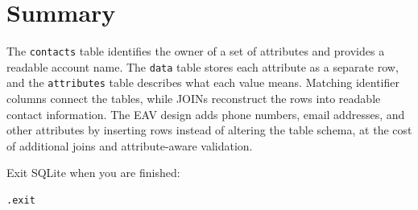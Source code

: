 \documentclass[11pt]{article}
\begin{document}
\section*{Summary}

The \texttt{contacts} table identifies the owner of a set of attributes and
provides a readable account name.
The \texttt{data} table stores each attribute as a separate row, and the
\texttt{attributes} table describes what each value means. Matching
identifier columns connect the tables, while JOINs reconstruct the rows into
readable contact information. The EAV design adds phone numbers, email
addresses, and other attributes by inserting rows instead of altering the table
schema, at the cost of additional joins and attribute-aware validation.

Exit SQLite when you are finished:

\begin{lstlisting}[language=SQL]
.exit
\end{lstlisting}
\end{document}
